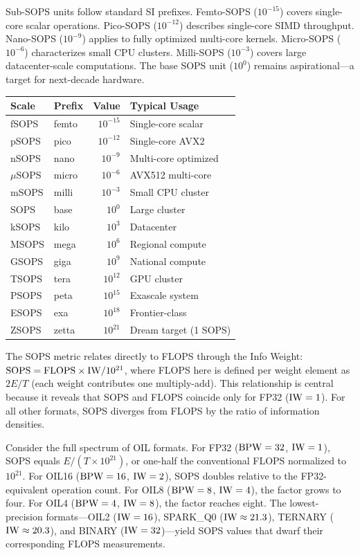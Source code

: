 Sub-SOPS units follow standard SI prefixes. Femto-SOPS ($10^{-15}$) covers single-core scalar operations. Pico-SOPS ($10^{-12}$) describes single-core SIMD throughput. Nano-SOPS ($10^{-9}$) applies to fully optimized multi-core kernels. Micro-SOPS ($10^{-6}$) characterizes small CPU clusters. Milli-SOPS ($10^{-3}$) covers large datacenter-scale computations. The base SOPS unit ($10^{0}$) remains aspirational---a target for next-decade hardware.

\begin{center}
\tablestyle
\begin{tabular}{llrl}
\toprule
\textbf{Scale} & \textbf{Prefix} & \textbf{Value} & \textbf{Typical Usage} \\
\midrule
fSOPS & femto & $10^{-15}$ & Single-core scalar \\
pSOPS & pico & $10^{-12}$ & Single-core AVX2 \\
nSOPS & nano & $10^{-9}$ & Multi-core optimized \\
$\mu$SOPS & micro & $10^{-6}$ & AVX512 multi-core \\
mSOPS & milli & $10^{-3}$ & Small CPU cluster \\
SOPS & base & $10^{0}$ & Large cluster \\
kSOPS & kilo & $10^{3}$ & Datacenter \\
MSOPS & mega & $10^{6}$ & Regional compute \\
GSOPS & giga & $10^{9}$ & National compute \\
TSOPS & tera & $10^{12}$ & GPU cluster \\
PSOPS & peta & $10^{15}$ & Exascale system \\
ESOPS & exa & $10^{18}$ & Frontier-class \\
ZSOPS & zetta & $10^{21}$ & Dream target (1 SOPS) \\
\bottomrule
\end{tabular}
\end{center}

The SOPS metric relates directly to FLOPS through the Info Weight: $\text{SOPS} = \text{FLOPS} \times \mathrm{IW} / 10^{21}$, where FLOPS here is defined per weight element as $2E/T$ (each weight contributes one multiply-add). This relationship is central because it reveals that SOPS and FLOPS coincide only for FP32 ($\mathrm{IW} = 1$). For all other formats, SOPS diverges from FLOPS by the ratio of information densities.

Consider the full spectrum of OIL formats. For FP32 ($\textnormal{BPW} = 32$, $\mathrm{IW} = 1$), SOPS equals $E / (T \times 10^{21})$, or one-half the conventional FLOPS normalized to $10^{21}$. For OIL16 ($\textnormal{BPW} = 16$, $\mathrm{IW} = 2$), SOPS doubles relative to the FP32-equivalent operation count. For OIL8 ($\textnormal{BPW} = 8$, $\mathrm{IW} = 4$), the factor grows to four. For OIL4 ($\textnormal{BPW} = 4$, $\mathrm{IW} = 8$), the factor reaches eight. The lowest-precision formats---OIL2 ($\mathrm{IW} = 16$), SPARK\_Q0 ($\mathrm{IW} \approx 21.3$), TERNARY ($\mathrm{IW} \approx 20.3$), and BINARY ($\mathrm{IW} = 32$)---yield SOPS values that dwarf their corresponding FLOPS measurements.

